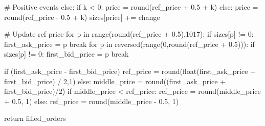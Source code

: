                 # Positive events
                else:
                    if k < 0:
                        price = round(ref_price + 0.5 + k)
                    else:
                        price = round(ref_price - 0.5 + k)
                    sizes[price] += change
                
            # Update ref price
            for p in range(round(ref_price + 0.5),1017):
                if sizes[p] != 0:
                    first_ask_price = p
                    break
            for p in reversed(range(0,round(ref_price + 0.5))):
                if sizes[p] != 0:
                    first_bid_price = p
                    break
        
            if (first_ask_price - first_bid_price) %
                ref_price = round(float(first_ask_price + first_bid_price) / 2,1)
            else:
                middle_price = round((first_ask_price + first_bid_price)/2)
                if middle_price < ref_price:
                    ref_price = round(middle_price + 0.5, 1)
                else:
                    ref_price = round(middle_price - 0.5, 1)
                    
    return filled_orders